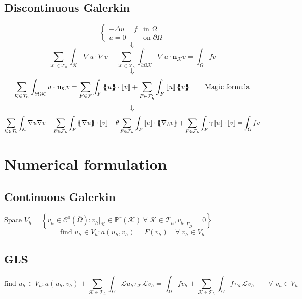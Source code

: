 \documentclass[a4paper,11pt]{article}
\theoremstyle{break}
\renewcommand*{\grad}{\nabla\mspace{1mu}}
\newcommand{\vect}[1]{\textbf{#1}}
\newcommand*{\txt}[1]{\text{#1}}
\newcommand*{\limited}[1]{\vert_{#1}}
\newcommand{\jump}[1]{\left[\!\left[#1\right]\!\right]}
\newcommand{\average}[1]{\left\{\mspace{-6.5mu}\left\{#1\right\}\mspace{-6.5mu}\right\}}
\newcommand{\element}{\mathcal{K}}
\newcommand{\triangulation}{\mathcal{T}_h}
\newcommand{\boundary}{{\partial\Omega}}
\newcommand{\eit}{{\element\in\triangulation}}
\newcommand{\normal}{\vect{n}}
\newcommand{\find}{\txt{find }}
\numberwithin{equation}{section}
\begin{document}
\subsection*{Discontinuous Galerkin}
\begin{equation*}
    \begin{cases}
        -\Delta u = f & \txt{in }\Omega \\
        u = 0 & \txt{on }\boundary
    \end{cases}
\end{equation*}
\[
    \Downarrow
\]
\[
    \sum_{\eit}\int_\element \grad u \cdot \grad v - \sum_\eit \int_{\boundary\element} \grad u \cdot \normal_\element v = \int_\Omega fv
\]
\[
    \Downarrow
\]
\begin{equation*}
    \sum_{\eit} \int_{\boundary\element} u \cdot \normal_\element v = \sum_{F \in \mathcal{F}} \int_F \average{u} \cdot \jump{v} + \sum_{F \in \mathcal{F}'_h} \int_F \jump{u}\average{v} \tag*{Magic formula}
\end{equation*}
\[\Downarrow\]
\begin{equation*}
    \begin{split}
        \sum_\eit \int_\element \grad u \grad v - \sum_{F \in \mathcal{F}_h} \int_F \average{\grad u} \cdot \jump{v} 
        -\theta \sum_{F \in \mathcal{F}_h} \int_F \jump{u} \cdot \average{\grad_h v} + \sum_{F \in \mathcal{F}_h} \int_F \gamma \jump{u} \cdot \jump{v} = \int_\Omega fv
    \end{split}
\end{equation*}
\section*{Numerical formulation}
\subsection*{Continuous Galerkin}
Space \(V_h = \left\{ v_h \in \mathcal{C}^0(\overline{\Omega}) : v_h\limited{\element} \in \mathbb{P}^r(\element) \ \forall \; \eit, v_h\limited{\Gamma_D} = 0 \right\}\)
\[
    \find u_h \in V_h : a(u_h,v_h) = F(v_h) \quad \forall \; v_h \in V_h
\]
\subsection*{GLS}
\[
    \find u_h \in V_h : a(u_h, v_h) + \sum_{\element \in \triangulation} \int_\Omega \mathcal{L}u_h \tau_\element \mathcal{L}v_h = \int_\Omega f v_h + \sum_{\element \in \triangulation} \int_\Omega f \tau_\element \mathcal{L}v_h \qquad \forall \; v_h \in V_h
\]
\end{document}
